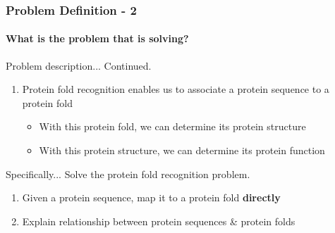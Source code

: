 \documentclass[xcolor={usenames,dvipsnames},hyperref={hyperindex,bookmarks}]{beamer}
\begin{document}
\frame
{
	\frametitle{Problem Definition - 2}
	\framesubtitle{What is the problem that \cite{Hou2018} is solving?}

	Problem description... Continued.
	\begin{enumerate}
	\item Protein fold recognition enables us to associate a protein sequence to a protein fold
		\begin{itemize}	%
		\item With this protein fold, we can determine its protein structure
		\item With this protein structure, we can determine its protein function
		\end{itemize}
	\end{enumerate}
	
	Specifically... Solve the protein fold recognition problem.
	\begin{enumerate}
	\item Given a protein sequence, map it to a protein fold {\bf directly}
	\item Explain relationship between protein sequences \& protein folds
	\end{enumerate}
	

}
\end{document}

